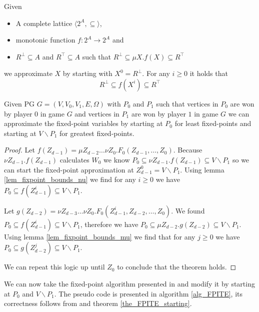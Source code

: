 \begin{lemma}
	\label{lem_fixpoint_bounds_mu}
	Given
	\begin{itemize}
		\item A complete lattice $\langle 2^A, \subseteq \rangle$,
		\item monotonic function $f : 2^A \rightarrow 2^A$ and
		\item $R^\bot \subseteq A$ and $R^\top \subseteq A$ such that $R^\bot \subseteq \mu X. f(X) \subseteq R^\top$
	\end{itemize}
	we approximate $X$ by starting with $X^0 = R^\bot$. For any $i \geq 0$ it holds that
	\[ R^\bot \subseteq f(X^i) \subseteq R^\top \]
\end{lemma}

\begin{theorem}
	\label{the_FPITE_starting}
	Given PG $G = (V,V_0,V_1,E,\Omega)$ with $P_0$ and $P_1$ such that vertices  in $P_0$ are won by player $0$ in game $G$ and vertices in $P_1$ are won by player $1$ in game $G$ we can approximate the fixed-point variables by starting at $P_0$ for least fixed-points and starting at $V \backslash P_1$ for greatest fixed-points.
	\begin{proof}
		Let $f(Z_{d-1}) = \mu Z_{d-2}\dots\nu Z_0.F_0(Z_{d-1},\dots,Z_0)$. Because $\nu Z_{d-1}.f(Z_{d-1})$ calculates $W_0$ we know $P_0 \subseteq \nu Z_{d-1}.f(Z_{d-1}) \subseteq V \backslash P_1$ so we can start the fixed-point approximation at $Z_{d-1}^0 = V\backslash P_1$. Using lemma \ref{lem_fixpoint_bounds_nu} we find for any $i \geq 0$ we have $P_0 \subseteq f(Z_{d-1}^i) \subseteq V \backslash P_1$.
		
		Let $g(Z_{d-2}) = \nu Z_{d-3} \dots \nu Z_0. F_0(Z_{d-1}^i,Z_{d-2},\dots,Z_0)$. We found $P_0 \subseteq f(Z_{d-1}^i) \subseteq V \backslash P_1$, therefore we have $P_0 \subseteq \mu Z_{d-2}.g(Z_{d-2})\subseteq V \backslash P_1$. Using lemma \ref{lem_fixpoint_bounds_mu} we find that for any $j \geq 0$ we have $P_0 \subseteq g(Z_{d-2}^j) \subseteq V\backslash P_1$.
		
		We can repeat this logic up until $Z_0$ to conclude that the theorem holds.
	\end{proof}
\end{theorem}
We can now take the fixed-point algorithm presented in \cite{FPITE} and modify it by starting at $P_0$ and $V \backslash P_1$. The pseudo code is presented in algorithm \ref{alg_FPITE}, its correctness follows from \cite{FPITE} and theorem \ref{the_FPITE_starting}.
